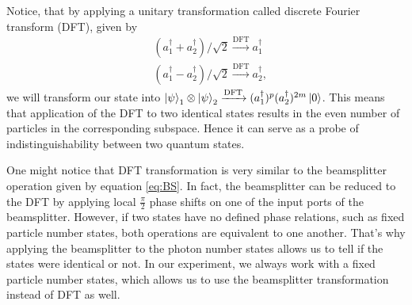 Notice, that by applying a unitary transformation called discrete Fourier transform (DFT), given by
\begin{equation}
\begin{aligned}
& (a_{1}^{\dagger} + a_{2}^{\dagger} )/\sqrt{2} \xrightarrow[]{\text{DFT}} a_{1}^{\dagger} \\
& (a_{1}^{\dagger} - a_{2}^{\dagger} )/\sqrt{2} \xrightarrow[]{\text{DFT}} a_{2}^{\dagger},
\end{aligned}
\label{eq:DFT}
\end{equation}
we will transform our state into $\left|\psi\right\rangle_1 \otimes \left|\psi\right\rangle_2 \xrightarrow[]{\text{DFT}} (a^{\dagger}_1)^p (a^{\dagger}_2)^{2m}\left|0\right\rangle$. This means that application of the DFT to two identical states results in the even number of particles in the corresponding subspace. Hence it can serve as a probe of indistinguishability between two quantum states.

One might notice that DFT transformation is very similar to the beamsplitter operation given by equation \ref{eq:BS}. In fact, the beamsplitter can be reduced to the DFT by applying local $\frac{\pi}{2}$ phase shifts on one of the input ports of the beamsplitter. However, if two states have no defined phase relations, such as fixed particle number states, both operations are equivalent to one another. That's why applying the beamsplitter to the photon number states allows us to tell if the states were identical or not. In our experiment, we always work with a fixed particle number states, which allows us to use the beamsplitter transformation instead of DFT as well. 

